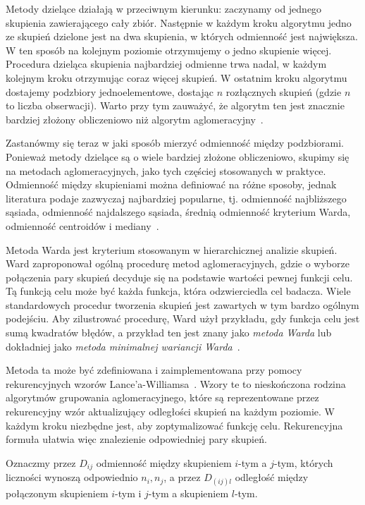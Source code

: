 \documentclass{praca1}
\begin{document}
Metody dzielące działają w przeciwnym kierunku: zaczynamy od jednego skupienia zawierającego cały zbiór. Następnie w każdym kroku algorytmu jedno ze skupień dzielone jest na dwa skupienia, w których odmienność jest największa. W ten sposób na kolejnym poziomie otrzymujemy o jedno skupienie więcej. Procedura dzieląca skupienia najbardziej odmienne trwa nadal, w każdym kolejnym kroku otrzymując coraz więcej skupień. W ostatnim kroku algorytmu dostajemy podzbiory jednoelementowe, dostając $n$ rozłącznych skupień (gdzie $n$ to liczba obserwacji). Warto przy tym zauważyć, że algorytm ten jest znacznie bardziej złożony obliczeniowo niż algorytm aglomeracyjny~\cite{Hastie2009:elements, Koronacki2005:statystyczne}.

Zastanówmy się teraz w jaki sposób mierzyć odmienność między podzbiorami. Ponieważ metody dzielące są o wiele bardziej złożone obliczeniowo, skupimy się na metodach aglomeracyjnych, jako tych częściej stosowanych w praktyce. Odmienność między skupieniami można definiować na różne sposoby, jednak literatura podaje zazwyczaj najbardziej popularne, tj. odmienność najbliższego sąsiada, odmienność najdalszego sąsiada, średnią odmienność kryterium Warda, odmienność centroidów i mediany~\cite{Hastie2009:elements, Koronacki2005:statystyczne}.

Metoda Warda jest kryterium stosowanym w hierarchicznej analizie skupień. Ward zaproponował ogólną procedurę metod aglomeracyjnych, gdzie o wyborze połączenia pary skupień decyduje się na podstawie wartości pewnej funkcji celu. Tą funkcją celu może być każda funkcja, która odzwierciedla cel badacza. Wiele standardowych procedur tworzenia skupień jest zawartych w tym bardzo ogólnym podejściu. Aby zilustrować procedurę, Ward użył przykładu, gdy funkcja celu jest sumą kwadratów błędów, a przykład ten jest znany jako \emph{metoda Warda} lub dokładniej jako \emph{metoda minimalnej wariancji Warda}~\cite{Ward1963:hierarchical}.

Metoda ta może być zdefiniowana i zaimplementowana przy pomocy rekurencyjnych wzorów Lance'a-Williamsa~\cite{Lance1967:hierarchical}. Wzory te to nieskończona rodzina algorytmów grupowania aglomeracyjnego, które są reprezentowane przez rekurencyjny wzór aktualizujący odległości skupień na każdym poziomie. W każdym kroku niezbędne jest, aby zoptymalizować funkcję celu. Rekurencyjna formuła ułatwia więc znalezienie odpowiedniej pary skupień.	

Oznaczmy przez $D_{ij}$ odmienność między skupieniem $i$-tym a $j$-tym, których liczności wynoszą odpowiednio $n_i, n_j$, a przez $D_{(ij)l}$ odległość między połączonym skupieniem $i$-tym i $j$-tym a skupieniem $l$-tym.
\end{document}
